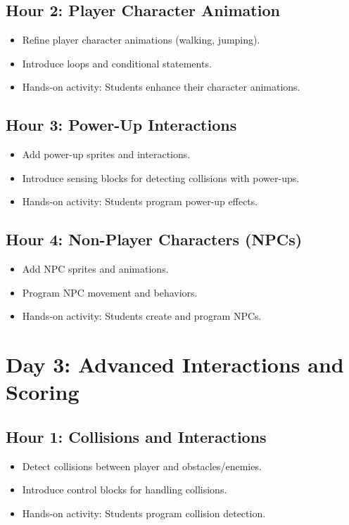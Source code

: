 \documentclass[main.tex]{subfiles}
\begin{document}
\subsection*{Hour 2: Player Character Animation}
\begin{itemize}
    \item Refine player character animations (walking, jumping).
    \item Introduce loops and conditional statements.
    \item Hands-on activity: Students enhance their character animations.
\end{itemize}

\subsection*{Hour 3: Power-Up Interactions}
\begin{itemize}
    \item Add power-up sprites and interactions.
    \item Introduce sensing blocks for detecting collisions with power-ups.
    \item Hands-on activity: Students program power-up effects.
\end{itemize}

\subsection*{Hour 4: Non-Player Characters (NPCs)}
\begin{itemize}
    \item Add NPC sprites and animations.
    \item Program NPC movement and behaviors.
    \item Hands-on activity: Students create and program NPCs.
\end{itemize}

\section*{Day 3: Advanced Interactions and Scoring}
\subsection*{Hour 1: Collisions and Interactions}
\begin{itemize}
    \item Detect collisions between player and obstacles/enemies.
    \item Introduce control blocks for handling collisions.
    \item Hands-on activity: Students program collision detection.
\end{itemize}
\end{document}

